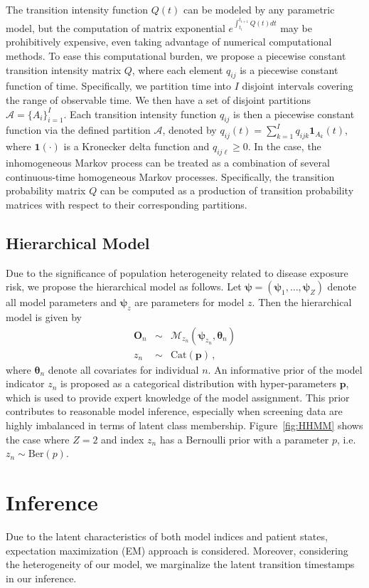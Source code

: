 \documentclass{article}
\begin{document}
The transition intensity function $Q(t)$ can be modeled by any parametric model, but the computation of matrix exponential $e^{\int _{t_i}^{t_{i+1}}Q(t)dt}$ may be prohibitively expensive, even taking  advantage of numerical computational methods. To ease this computational burden, we propose a piecewise constant transition intensity matrix $Q$, where each element $q_{ij}$ is a piecewise constant function of time. Specifically, we partition time into $I$ disjoint intervals covering the range of observable time.  We then have a set of disjoint partitions $\mathcal{A} = \{ A_i\}_{i=1}^{I}$. Each transition intensity function $q_{ij}$ is then a piecewise constant function via the defined partition $\mathcal{A}$, denoted by $q_{ij}(t) = \sum_{k = 1}^{I}q_{ijk} \bm 1_{A_k}(t)$, where $\bm 1(\cdot)$ is a Kronecker delta function and $q_{ij\ell} \geq 0$. In the case, the inhomogeneous Markov process can be treated as a combination of several continuous-time homogeneous Markov processes. Specifically, the transition probability matrix $Q$ can be computed as a production of transition probability matrices with respect to their corresponding partitions.

\subsection{Hierarchical Model}

Due to the significance of population heterogeneity related to disease exposure risk, we propose the hierarchical model as follows. Let $\bm \psi = (\bm \psi_1, \ldots, \bm \psi_Z)$ denote all model parameters and $\bm \psi_z$ are parameters for model $z$. Then the hierarchical model is given by
\begin{eqnarray*}
	\bm O_n & \sim & \mathcal{M}_{z_n}(\bm \psi_{z_n}, \bm \theta_n) \\
	z_n & \sim & \mathrm{Cat}(\bm p)\,, 
\end{eqnarray*}
where $\bm \theta_n$ denote all covariates for individual $n$. An informative prior of the model indicator $z_n$ is proposed as a categorical distribution with hyper-parameters $\bm p$, which is used to provide expert knowledge of the model assignment. This prior contributes to reasonable model inference, especially when screening data are highly imbalanced in terms of latent class membership.    Figure~\ref{fig:HHMM} shows the case where $Z=2$ and index $z_n$ has a Bernoulli prior with a parameter $p$, i.e.\ $z_n \sim \mathrm{Ber}(p)$.


\section{Inference}
Due to the latent characteristics of both model indices and patient states, expectation maximization (EM) approach is considered. Moreover, considering the heterogeneity of our model, we marginalize the latent transition timestamps in our inference. 
\end{document}

